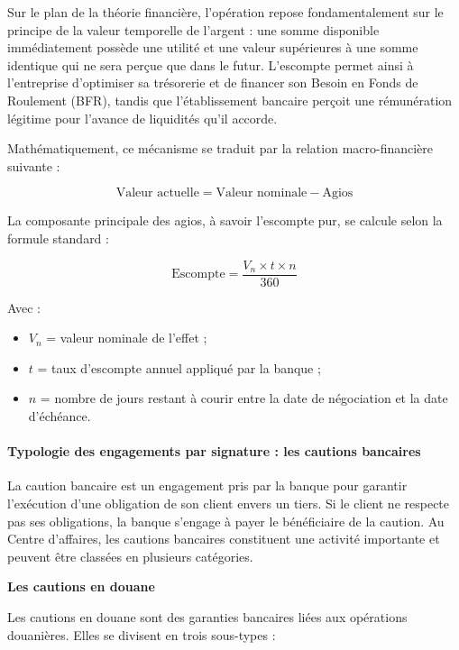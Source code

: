 Sur le plan de la théorie financière, l'opération repose fondamentalement sur le principe de la valeur temporelle de l'argent : une somme disponible immédiatement possède une utilité et une valeur supérieures à une somme identique qui ne sera perçue que dans le futur. L'escompte permet ainsi à l'entreprise d'optimiser sa trésorerie et de financer son Besoin en Fonds de Roulement (BFR), tandis que l'établissement bancaire perçoit une rémunération légitime pour l'avance de liquidités qu'il accorde.

Mathématiquement, ce mécanisme se traduit par la relation macro-financière suivante :

\begin{equation}
  \text{Valeur actuelle} = \text{Valeur nominale} - \text{Agios}
\end{equation}

La composante principale des agios, à savoir l'escompte pur, se calcule selon la formule standard :

\begin{equation}
  \text{Escompte} = \frac{V_n \times t \times n}{360}
\end{equation}

Avec :
\begin{itemize}
  \item $V_n$ = valeur nominale de l'effet ;
  \item $t$ = taux d'escompte annuel appliqué par la banque ;
  \item $n$ = nombre de jours restant à courir entre la date de négociation et la date d'échéance.
\end{itemize}

\paragraph{Typologie des engagements par signature : les cautions bancaires}

La caution bancaire est un engagement pris par la banque pour garantir l'exécution d'une obligation de son client envers un tiers. Si le client ne respecte pas ses obligations, la banque s'engage à payer le bénéficiaire de la caution. Au Centre d'affaires, les cautions bancaires constituent une activité importante et peuvent être classées en plusieurs catégories.

\medskip\textbf{Les cautions en douane}

Les cautions en douane sont des garanties bancaires liées aux opérations douanières. Elles se divisent en trois sous-types :

